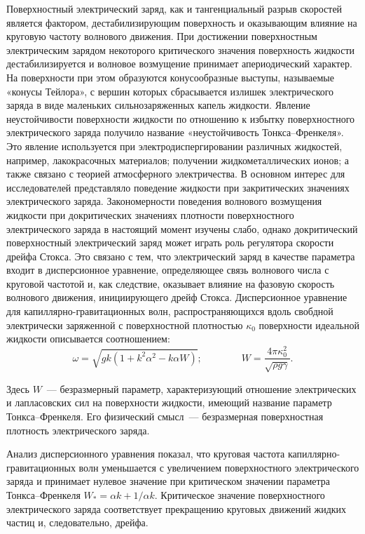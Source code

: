 Поверхностный электрический заряд, как и тангенциальный разрыв скоростей является фактором, дестабилизирующим поверхность и оказывающим влияние на круговую частоту волнового движения. При достижении поверхностным электрическим зарядом некоторого критического значения поверхность жидкости дестабилизируется и волновое возмущение принимает апериодический характер. На поверхности при этом образуются конусообразные выступы, называемые «конусы Тейлора», с вершин которых сбрасывается излишек электрического заряда в виде маленьких сильнозаряженных капель жидкости. Явление неустойчивости поверхности жидкости по отношению к избытку поверхностного электрического заряда получило название «неустойчивость Тонкса--Френкеля». Это явление используется при электродиспергировании различных жидкостей, например, лакокрасочных материалов; получении жидкометаллических ионов; а также связано с теорией атмосферного электричества. В основном интерес для исследователей представляло поведение жидкости при закритических значениях электрического заряда. Закономерности поведения волнового возмущения жидкости при докритических значениях плотности поверхностного электрического заряда в настоящий момент изучены слабо, однако докритический поверхностный электрический заряд может играть роль регулятора скорости дрейфа Стокса. Это связано с тем, что электрический заряд в качестве параметра входит в дисперсионное уравнение, определяющее связь волнового числа с круговой частотой и, как следствие, оказывает влияние на фазовую скорость волнового движения, инициирующего дрейф Стокса. Дисперсионное уравнение для капиллярно-гравитационных волн, распространяющихся вдоль свобдной электрически заряженной с поверхностной плотностью $ \kappa_{0} $ поверхности идеальной жидкости описывается соотношением:
\begin{equation}
\omega = \sqrt{gk \left( 1+k^{2}\alpha^{2}-k\alpha W \right)}; \qquad \qquad  W=\dfrac{4 \pi \kappa_{0}^{2}}{\sqrt{\rho g \gamma}}.
\label{DUTF}
\end{equation}

Здесь $ W $~--- безразмерный параметр, характеризующий отношение электрических и лапласовских сил на поверхности жидкости, имеющий название параметр Тонкса--Френкеля. Его физический смысл~--- безразмерная поверхностная плотность электрического заряда.

Анализ дисперсионного уравнения показал, что круговая частота капиллярно-гравитационных волн уменьшается с увеличением поверхностного электрического заряда и принимает нулевое значение при критическом значении параметра Тонкса--Френкеля $ W_{*}=\alpha k +1/\alpha k  $. Критическое значение поверхностного электрического заряда соответствует прекращению круговых движений жидких частиц и, следовательно, дрейфа.

